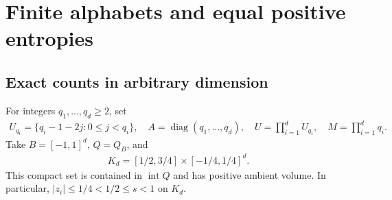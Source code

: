 \documentclass[11pt,a4paper]{article}
\theoremstyle{definition}
\theoremstyle{remark}
\begin{document}
\section{Finite alphabets and equal positive entropies}\label{sec:examples}

\subsection{Exact counts in arbitrary dimension}

For integers \(q_1,\ldots,q_d\geq2\), set
\begin{align*}
 U_{q_i}=\{q_i-1-2j:0\leq j<q_i\},\quad
 A=\operatorname{diag}(q_1,\ldots,q_d),\quad
 U=\prod_{i=1}^d U_{q_i},\quad M=\prod_{i=1}^d q_i.
\end{align*}
Take \(B=[-1,1]^d\), \(Q=Q_B\), and
\begin{align}\label{eq:K}
 K_d=[1/2,3/4]\times[-1/4,1/4]^d.
\end{align}
This compact set is contained in \(\operatorname{int} Q\) and has positive ambient volume. In particular, \(|z_i|\leq1/4<1/2\leq s<1\) on \(K_d\).
\end{document}
